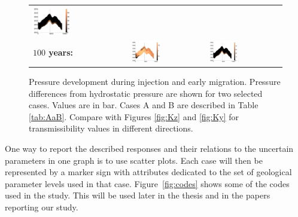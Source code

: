 \begin{figure}
\begin{tabular}{MMM}
\includegraphics[width=0.4\textwidth]{./figurer/C03211p50_slcy}\\
\textbf{$100$ years:}&
\includegraphics[width=0.4\textwidth]{./figurer/C02222p100_slcy}&
\includegraphics[width=0.4\textwidth]{./figurer/C03211p100_slcy}\\
\end{tabular}
\caption{Pressure development during injection and early migration. Pressure differences from hydrostatic pressure are shown for two selected cases. Values are in bar. Cases A and B are described in Table \ref{tab:AaB}. Compare with Figures \ref{fig:Kz} and \ref{fig:Ky} for transmissibility values in different directions.}
\label{fig:Pplume}
\end{figure}


One way to report the described responses and their relations to the uncertain
parameters in one graph is to use scatter plots. Each case will then be
represented by a marker sign with attributes dedicated to the set of geological
parameter levels used in that case. Figure~\ref{fig:codes} shows some of the codes used in the study. This will be used later in the thesis and in the papers reporting our study.


